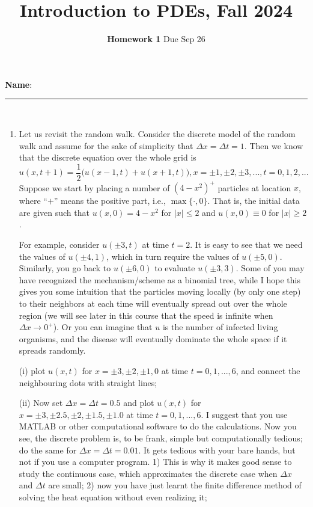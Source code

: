\documentclass[6pt]{article}
\title{Introduction to PDEs, Fall 2024}
\author{\textbf{Homework 1} Due Sep 26}
\date{}
\numberwithin{equation}{section}
\begin{document}
\maketitle

\textbf{Name}:\rule{1 in}{0.001 in} \\
\begin{enumerate}

\item Let us revisit the random walk.  Consider the discrete model of the random walk and assume for the sake of simplicity that $\Delta x=\Delta t=1$.  Then we know that the discrete equation over the whole grid is
\begin{equation}\label{discrete}
u(x,t+1)=\frac{1}{2}\big(u(x-1,t)+u(x+1,t)\big), x=\pm 1,\pm2, \pm3,..., t=0,1,2,...
\end{equation}
Suppose we start by placing a number of $(4-x^2)^+$ particles at location $x$, where ``$+$'' means the positive part, i.e., $\max\{\cdot,0\}$.  That is, the initial data are given such that $u(x,0)=4-x^2$ for $|x|\leq2$ and $u(x,0)\equiv0$ for $|x|\geq2$.

For example, consider $u(\pm3,t)$ at time $t=2$.  It is easy to see that we need the values of $u(\pm4,1)$, which in turn require the values of $u(\pm 5,0)$.  Similarly, you go back to $u(\pm6,0)$ to evaluate $u(\pm3,3)$.  Some of you may have recognized the mechanism/scheme as a binomial tree, while I hope this gives you some intuition that the particles moving locally (by only one step) to their neighbors at each time will eventually spread out over the whole region (we will see later in this course that the speed is infinite when $\Delta x\rightarrow 0^+$).  Or you can imagine that $u$ is the number of infected living organisms, and the disease will eventually dominate the whole space if it spreads randomly.

(i) plot $u(x,t)$ for $x=\pm3,\pm2,\pm1,0$ at time $t=0,1,...,6$, and connect the neighbouring dots with straight lines;

(ii) Now set $\Delta x=\Delta t=0.5$ and plot $u(x,t)$ for $x=\pm3,\pm 2.5,\pm2,\pm 1.5,\pm1.0$ at time $t=0,1,...,6$. I suggest that you use MATLAB or other computational software to do the calculations.  Now you see, the discrete problem is, to be frank, simple but computationally tedious; do the same for $\Delta x=\Delta t=0.01$.  It gets tedious with your bare hands, but not if you use a computer program.  1) This is why it makes good sense to study the continuous case, which approximates the discrete case when $\Delta x$ and $\Delta t$ are small; 2) now you have just learnt the finite difference method of solving the heat equation without even realizing it;


\end{enumerate}
\end{document}

